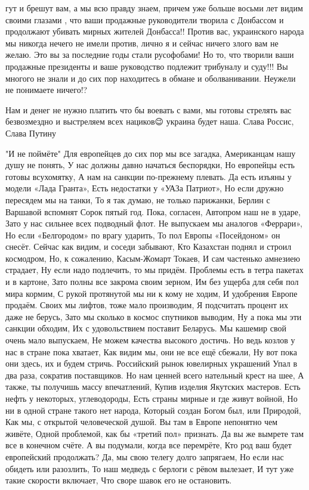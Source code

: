 гут и брешут вам, а мы всю правду знаем, причем уже больше восьми лет видим
своими глазами , что ваши продажные руководители творила с Донбассом и
продолжают убивать мирных жителей Донбасса!! Против вас, украинского народа мы
никогда нечего не имели против, лично я и сейчас ничего злого вам не желаю. Это
вы за последние годы стали русофобами! Но то, что творили ваши продажные
президенты и ваше руководство подлежит трибуналу и суду!!! Вы многого не знали
и до сих пор находитесь в обмане и оболванивании. Неужели не понимаете ничего!?

Нам и денег не нужно платить что бы воевать с вами, мы готовы стрелять вас
безвозмездно и выстреляем всех нациков😉 украина будет наша. Слава Россис,
Слава Путину

"И не поймёте"
Для европейцев до сих пор мы все загадка,
Американцам нашу душу не понять,
У нас должны давно начаться беспорядки,
Но европейцы есть готовы всухомятку,
А нам на санкции по-прежнему плевать.
Да есть изъяны у модели «Лада Гранта»,
Есть недостатки у «УАЗа Патриот»,
Но если дружно пересядем мы на танки,
То я так думаю, не только парижанки,
Берлин с Варшавой вспомнят Сорок пятый год.
Пока, согласен, Автопром наш не в ударе,
Зато у нас сильнее всех подводный флот.
Не выпускаем мы аналогов «Феррари»,
Но если «Белгородом» по врагу ударить,
То пол Европы «Посейдоном» он снесёт.
Сейчас как видим, и соседи забывают,
Кто Казахстан поднял и строил космодром,
Но, к сожалению, Касым-Жомарт Токаев,
И сам частенько амнезиею страдает,
Ну если надо подлечить, то мы придём.
Проблемы есть в тетра пакетах и в картоне,
Зато полны все закрома своим зерном,
Им без ущерба для себя пол мира кормим,
С рукой протянутой мы ни к кому не ходим,
И удобрения Европе продаём.
Своих мы лифтов, тоже мало производим,
Я подсчитать процент их даже не берусь,
Зато мы сколько в космос спутников выводим,
Ну а пока мы эти санкции обходим,
Их с удовольствием поставит Беларусь.
Мы кашемир свой очень мало выпускаем,
Не можем качества высокого достичь.
Но ведь козлов у нас в стране пока хватает,
Как видим мы, они не все ещё сбежали,
Ну вот пока они здесь, их и будем стричь.
Российский рынок ювелирных украшений
Упал в два раза, сократив поставщиков.
Но нам ценней всего нательный крест на шее,
А также, ты получишь массу впечатлений,
Купив изделия Якутских мастеров.
Есть нефть у некоторых, углеводороды,
Есть страны мирные и где живут войной,
Но ни в одной стране такого нет народа,
Который создан Богом был, или Природой,
Как мы, с открытой человеческой душой.
Вы там в Европе непонятно чем живёте,
Одной проблемой, как бы «третий пол» признать.
Да вы же вымрете там все в конечном счёте.
А вы подумали, когда все перемрёте,
Кто род ваш будет европейский продолжать?
Да, мы свою телегу долго запрягаем,
Но если нас обидеть или разозлить,
То наш медведь с берлоги с рёвом вылезает,
И тут уже такие скорости включает,
Что своре шавок его не остановить.

